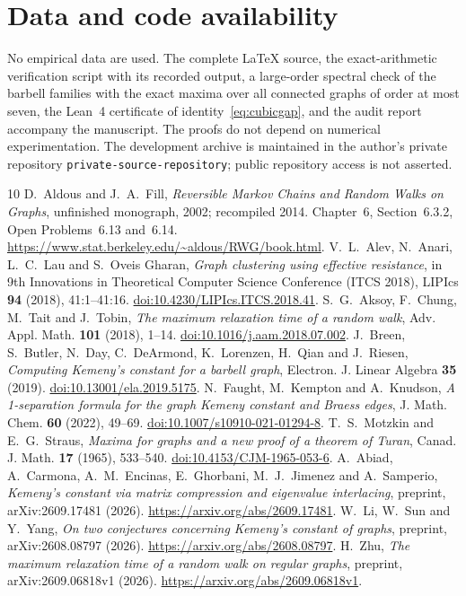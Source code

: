 \documentclass[11pt]{amsart}
\numberwithin{equation}{section}
\theoremstyle{definition}
\theoremstyle{remark}
\begin{document}
\section*{Data and code availability}
No empirical data are used. The complete \LaTeX{} source, the exact-arithmetic
verification script with its recorded output, a large-order spectral check
of the barbell families with the exact maxima over all connected graphs of
order at most seven, the Lean~4 certificate of identity~\eqref{eq:cubicgap},
and the audit report accompany the manuscript. The proofs do not depend on
numerical experimentation. The development archive is maintained in the
author's private repository \texttt{private-source-repository}; public
repository access is not asserted.

\begin{thebibliography}{10}
D.~Aldous and J.~A.~Fill, \emph{Reversible Markov Chains and Random Walks on Graphs}, unfinished monograph, 2002; recompiled 2014. Chapter~6, Section~6.3.2, Open Problems~6.13 and~6.14. \url{https://www.stat.berkeley.edu/~aldous/RWG/book.html}.
V.~L.~Alev, N.~Anari, L.~C.~Lau and S.~Oveis Gharan, \emph{Graph clustering using effective resistance}, in 9th Innovations in Theoretical Computer Science Conference (ITCS 2018), LIPIcs \textbf{94} (2018), 41:1--41:16. \href{https://doi.org/10.4230/LIPIcs.ITCS.2018.41}{doi:10.4230/LIPIcs.ITCS.2018.41}.
S.~G.~Aksoy, F.~Chung, M.~Tait and J.~Tobin, \emph{The maximum relaxation time of a random walk}, Adv. Appl. Math. \textbf{101} (2018), 1--14. \href{https://doi.org/10.1016/j.aam.2018.07.002}{doi:10.1016/j.aam.2018.07.002}.
J.~Breen, S.~Butler, N.~Day, C.~DeArmond, K.~Lorenzen, H.~Qian and J.~Riesen, \emph{Computing Kemeny's constant for a barbell graph}, Electron. J. Linear Algebra \textbf{35} (2019). \href{https://doi.org/10.13001/ela.2019.5175}{doi:10.13001/ela.2019.5175}.
N.~Faught, M.~Kempton and A.~Knudson, \emph{A 1-separation formula for the graph Kemeny constant and Braess edges}, J. Math. Chem. \textbf{60} (2022), 49--69. \href{https://doi.org/10.1007/s10910-021-01294-8}{doi:10.1007/s10910-021-01294-8}.
T.~S.~Motzkin and E.~G.~Straus, \emph{Maxima for graphs and a new proof of a theorem of Turan}, Canad. J. Math. \textbf{17} (1965), 533--540. \href{https://doi.org/10.4153/CJM-1965-053-6}{doi:10.4153/CJM-1965-053-6}.
A.~Abiad, A.~Carmona, A.~M.~Encinas, E.~Ghorbani, M.~J.~Jimenez and A.~Samperio, \emph{Kemeny's constant via matrix compression and eigenvalue interlacing}, preprint, arXiv:2609.17481 (2026). \url{https://arxiv.org/abs/2609.17481}.
W.~Li, W.~Sun and Y.~Yang, \emph{On two conjectures concerning Kemeny's constant of graphs}, preprint, arXiv:2608.08797 (2026). \url{https://arxiv.org/abs/2608.08797}.
H.~Zhu, \emph{The maximum relaxation time of a random walk on regular graphs}, preprint, arXiv:2609.06818v1 (2026). \url{https://arxiv.org/abs/2609.06818v1}.
\end{thebibliography}
\end{document}
